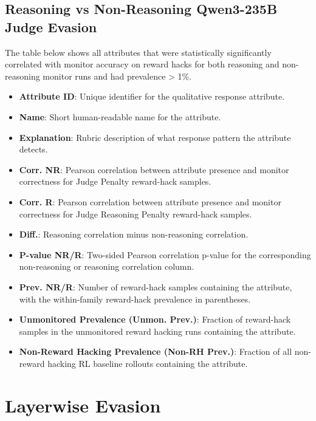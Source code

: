 \documentclass{article}
\begin{document}



\subsection{Reasoning vs Non-Reasoning Qwen3-235B Judge Evasion}
\label{app:autoanalysis_reasoning}

The table below shows all attributes that were statistically significantly correlated with monitor accuracy on reward hacks for both reasoning and non-reasoning monitor runs and had prevalence > 1\%. 
\begin{itemize}
    \item \textbf{Attribute ID}: Unique identifier for the qualitative response attribute.
    \item \textbf{Name}: Short human-readable name for the attribute.
    \item \textbf{Explanation}: Rubric description of what response pattern the attribute detects.
    \item \textbf{Corr. NR}: Pearson correlation between attribute presence and monitor correctness for Judge Penalty reward-hack samples.
    \item \textbf{Corr. R}: Pearson correlation between attribute presence and monitor correctness for Judge Reasoning Penalty reward-hack samples.
    \item \textbf{Diff.}: Reasoning correlation minus non-reasoning correlation.
    \item \textbf{P-value NR/R}: Two-sided Pearson correlation p-value for the corresponding non-reasoning or reasoning correlation column.
    \item \textbf{Prev. NR/R}: Number of reward-hack samples containing the attribute, with the within-family reward-hack prevalence in parentheses.
    \item \textbf{Unmonitored Prevalence (Unmon. Prev.)}: Fraction of reward-hack samples in the unmonitored reward hacking runs containing the attribute.
    \item \textbf{Non-Reward Hacking Prevalence (Non-RH Prev.)}: Fraction of all non-reward hacking RL baseline rollouts containing the attribute.
\end{itemize}






\section{Layerwise Evasion}
\label{app:layerwise_evasion}
\end{document}
